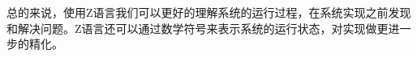 \documentclass{article}
\begin{document}
\begin{CJK}{UTF8}{gbsn}
\begin{spacing}{1.4}
总的来说，使用Z语言我们可以更好的理解系统的运行过程，在系统实现之前发现和解决问题。Z语言还可以通过数学符号来表示系统的运行状态，对实现做更进一步的精化。

\end{spacing}
\end{CJK}
\end{document}
